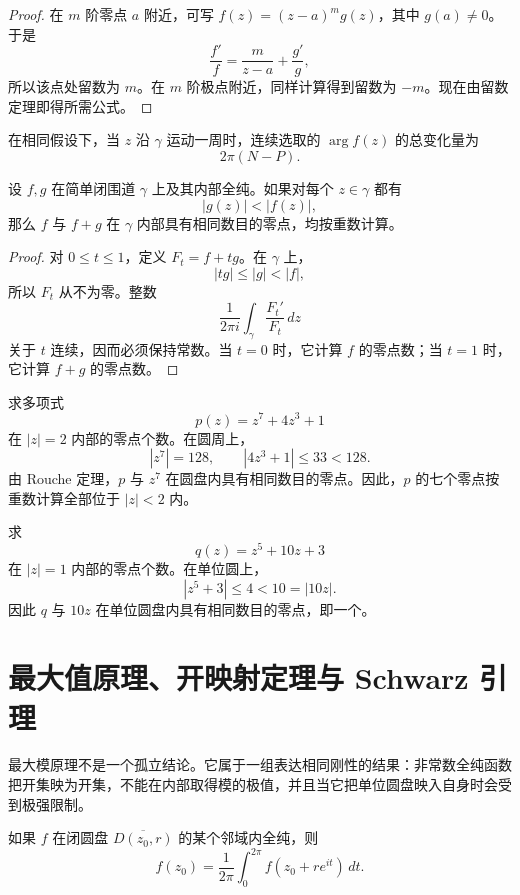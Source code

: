 \begin{proof}
在 $m$ 阶零点 $a$ 附近，可写 $f(z)=(z-a)^m g(z)$，其中 $g(a)\neq0$。于是
\[
    \frac{f'}{f}=\frac{m}{z-a}+\frac{g'}{g},
\]
所以该点处留数为 $m$。在 $m$ 阶极点附近，同样计算得到留数为 $-m$。现在由留数定理即得所需公式。
\end{proof}

\begin{corollary}[辐角变化量]
在相同假设下，当 $z$ 沿 $\gamma$ 运动一周时，连续选取的 $\arg f(z)$ 的总变化量为
\[
    2\pi(N-P).
\]
\end{corollary}

\begin{theorem}[Rouche 定理]
设 $f,g$ 在简单闭围道 $\gamma$ 上及其内部全纯。如果对每个 $z\in\gamma$ 都有
\[
    |g(z)|<|f(z)|,
\]
那么 $f$ 与 $f+g$ 在 $\gamma$ 内部具有相同数目的零点，均按重数计算。
\end{theorem}

\begin{proof}
对 $0\leq t\leq1$，定义 $F_t=f+tg$。在 $\gamma$ 上，
\[
    |tg|\leq|g|<|f|,
\]
所以 $F_t$ 从不为零。整数
\[
    \frac{1}{2\pi i}\int_\gamma\frac{F_t'}{F_t}\,dz
\]
关于 $t$ 连续，因而必须保持常数。当 $t=0$ 时，它计算 $f$ 的零点数；当 $t=1$ 时，它计算 $f+g$ 的零点数。
\end{proof}

\begin{example}
求多项式
\[
    p(z)=z^7+4z^3+1
\]
在 $|z|=2$ 内部的零点个数。在圆周上，
\[
    |z^7|=128,
    \qquad
    |4z^3+1|\leq33<128.
\]
由 Rouche 定理，$p$ 与 $z^7$ 在圆盘内具有相同数目的零点。因此，$p$ 的七个零点按重数计算全部位于 $|z|<2$ 内。
\end{example}

\begin{example}
求
\[
    q(z)=z^5+10z+3
\]
在 $|z|=1$ 内部的零点个数。在单位圆上，
\[
    |z^5+3|\leq4<10=|10z|.
\]
因此 $q$ 与 $10z$ 在单位圆盘内具有相同数目的零点，即一个。
\end{example}

\section{最大值原理、开映射定理与 Schwarz 引理}

最大模原理不是一个孤立结论。它属于一组表达相同刚性的结果：非常数全纯函数把开集映为开集，不能在内部取得模的极值，并且当它把单位圆盘映入自身时会受到极强限制。

\begin{theorem}[平均值性质]
如果 $f$ 在闭圆盘 $\overline{D(z_0,r)}$ 的某个邻域内全纯，则
\[
    f(z_0)=\frac{1}{2\pi}\int_0^{2\pi}f(z_0+re^{it})\,dt.
\]
\end{theorem}

